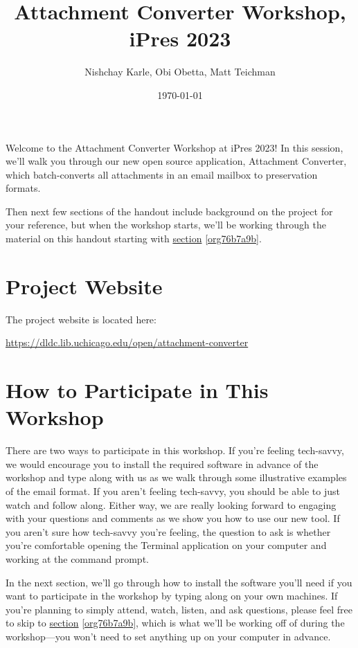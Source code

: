 \documentclass[11pt]{article}
\author{Nishchay Karle, Obi Obetta, Matt Teichman}
\date{\today}
\title{Attachment Converter Workshop, iPres 2023}
\begin{document}
\maketitle
Welcome to the Attachment Converter Workshop at iPres 2023!  In this
session, we'll walk you through our new open source application,
Attachment Converter, which batch-converts all attachments in an email
mailbox to preservation formats.

Then next few sections of the handout include background on the
project for your reference, but when the workshop starts, we'll be
working through the material on this handout starting with \hyperref[org76b7a9b]{section}
\ref{org76b7a9b}.

\section{Project Website}
\label{sec:orgaaad8f0}

The project website is located here:

\url{https://dldc.lib.uchicago.edu/open/attachment-converter}


\section{How to Participate in This Workshop}
\label{sec:org9cea003}

There are two ways to participate in this workshop.  If you're feeling
tech-savvy, we would encourage you to install the required software in
advance of the workshop and type along with us as we walk through some
illustrative examples of the email format.  If you aren't feeling
tech-savvy, you should be able to just watch and follow along.  Either
way, we are really looking forward to engaging with your questions and
comments as we show you how to use our new tool. If you aren't sure
how tech-savvy you're feeling, the question to ask is whether you're
comfortable opening the Terminal application on your computer and
working at the command prompt.

In the next section, we'll go through how to install the software
you'll need if you want to participate in the workshop by typing along
on your own machines.  If you're planning to simply attend, watch,
listen, and ask questions, please feel free to skip to \hyperref[org76b7a9b]{section}
\ref{org76b7a9b}, which is what we'll be working off of during the
workshop---you won't need to set anything up on your computer in
advance.
\end{document}
